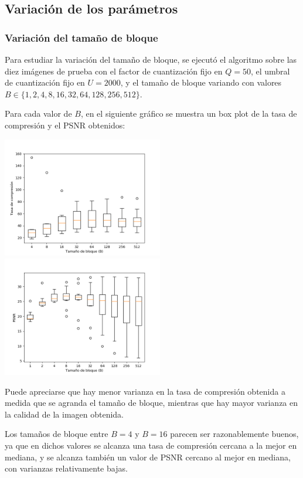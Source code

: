 \documentclass{article}
\newcommand{\set}[1]{\{#1\}}
\begin{document}
\subsection{Variación de los parámetros}

\subsubsection{Variación del tamaño de bloque}
\label{sec:variacion_tam_bloque}

Para estudiar la variación del tamaño de bloque, se ejecutó el
algoritmo sobre las diez imágenes de prueba con el
factor de cuantización fijo en $Q = 50$,
el umbral de cuantización fijo en $U = 2000$,
y el tamaño de bloque variando con valores
$B \in \set{1,2,4,8,16,32,64,128,256,512}$.

Para cada valor de $B$, en el siguiente gráfico se muestra un
box plot de la tasa de compresión y el PSNR obtenidos:\\
\begin{center}
\includegraphics[width=7cm]{../imgs/output/gray_plots/b_rate.png}
\includegraphics[width=7cm]{../imgs/output/gray_plots/b_psnr.png}
\end{center}

Puede apreciarse que hay menor varianza en la tasa de compresión
obtenida a medida que se agranda el tamaño de bloque,
mientras que hay mayor varianza en la calidad de la imagen obtenida.

Los tamaños de bloque entre $B = 4$ y $B = 16$ parecen ser razonablemente
buenos,
ya que en dichos valores se alcanza una tasa de compresión cercana a la
mejor en mediana,
y se alcanza también un valor de PSNR cercano al mejor en mediana,
con varianzas relativamente bajas.
\end{document}
